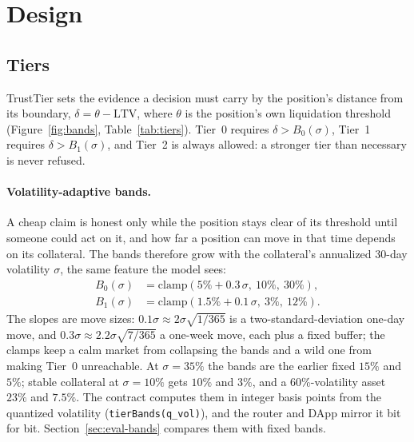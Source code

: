 \documentclass[sigconf,nonacm]{acmart}
\newcommand{\code}[1]{\texttt{\smaller #1}}
\begin{document}
\section{Design}
\label{sec:design}

\subsection{Tiers}
\label{sec:design-tiers}

TrustTier sets the evidence a decision must carry by the position's distance from its boundary, $\delta = \theta - \mathrm{LTV}$, where $\theta$ is the position's own liquidation threshold (Figure~\ref{fig:bands}, Table~\ref{tab:tiers}). Tier~0 requires $\delta > B_0(\sigma)$, Tier~1 requires $\delta > B_1(\sigma)$, and Tier~2 is always allowed: a stronger tier than necessary is never refused.

\paragraph{Volatility-adaptive bands.} A cheap claim is honest only while the position stays clear of its threshold until someone could act on it, and how far a position can move in that time depends on its collateral. The bands therefore grow with the collateral's annualized 30-day volatility $\sigma$, the same feature the model sees:
\begin{align*}
B_0(\sigma) &= \mathrm{clamp}(5\% + 0.3\,\sigma,\ 10\%,\ 30\%),\\
B_1(\sigma) &= \mathrm{clamp}(1.5\% + 0.1\,\sigma,\ 3\%,\ 12\%).
\end{align*}
The slopes are move sizes: $0.1\sigma \approx 2\sigma\sqrt{1/365}$ is a two-standard-deviation one-day move, and $0.3\sigma \approx 2.2\sigma\sqrt{7/365}$ a one-week move, each plus a fixed buffer; the clamps keep a calm market from collapsing the bands and a wild one from making Tier~0 unreachable. At $\sigma=35\%$ the bands are the earlier fixed $15\%$ and $5\%$; stable collateral at $\sigma=10\%$ gets $10\%$ and $3\%$, and a 60\%-volatility asset $23\%$ and $7.5\%$. The contract computes them in integer basis points from the quantized volatility (\code{tierBands(q\_vol)}), and the router and DApp mirror it bit for bit. Section~\ref{sec:eval-bands} compares them with fixed bands.
\end{document}
